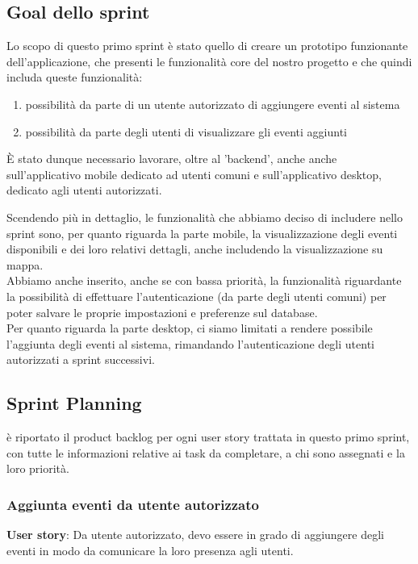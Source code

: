 \documentclass{article}
\begin{document}
\subsection{Goal dello sprint}
Lo scopo di questo primo sprint è stato quello di creare un prototipo funzionante dell'applicazione, che presenti le funzionalità core del nostro progetto e che quindi includa queste funzionalità:
\begin{enumerate}
\item possibilità da parte di un utente autorizzato di aggiungere eventi al sistema
\item possibilità da parte degli utenti di visualizzare gli eventi aggiunti
\end{enumerate}
È stato dunque necessario lavorare, oltre al 'backend', anche anche sull'applicativo mobile dedicato ad utenti comuni e sull'applicativo desktop, dedicato agli utenti autorizzati.

Scendendo più in dettaglio, le funzionalità che abbiamo deciso di includere nello sprint sono, per quanto riguarda la parte mobile, la visualizzazione degli eventi disponibili e dei loro relativi dettagli, anche includendo la visualizzazione su mappa.\\
Abbiamo anche inserito, anche se con bassa priorità, la funzionalità riguardante la possibilità di effettuare l'autenticazione (da parte degli utenti comuni) per poter salvare le proprie impostazioni e preferenze sul database.\\
Per quanto riguarda la parte desktop, ci siamo limitati a rendere possibile l'aggiunta degli eventi al sistema, rimandando l'autenticazione degli utenti autorizzati a sprint successivi.

\subsection{Sprint Planning}
è riportato il product backlog per ogni user story trattata in questo primo sprint, con tutte le informazioni relative ai task da completare, a chi sono assegnati e la loro priorità.\\
\subsubsection{Aggiunta eventi da utente autorizzato}
\textbf{User story}: Da utente autorizzato, devo essere in grado di aggiungere degli eventi in modo da comunicare la loro presenza agli utenti.\\
\end{document}
